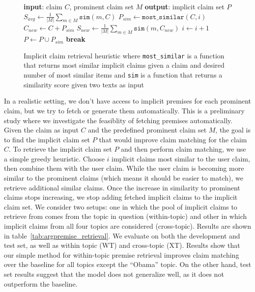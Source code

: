 \begin{figure}
\begin{algorithmic}[1]
\State \textbf{input}: claim $C$, prominent claim set $M$
\State \textbf{output}: implicit claim set $P$
\State
\State $S_{avg} \gets \frac{1}{|M|} \sum_{m \in M} \mathtt{sim}(m, C)$
  \State $P_{sim} \gets \mathtt{most\_similar}(C, i)$
  \State $C_{new} \gets C + P_{sim}$
  \State $S_{new} \gets \frac{1}{|M|} \sum_{m \in M} \mathtt{sim}(m, C_{new})$
  \State
    \State $i \gets i + 1$
    \State $P \gets P \cup P_{sim}$
  \Else
    \State \textbf{break}
  \EndIf
  \State
\EndFor
\end{algorithmic}
\caption{Implicit claim retrieval heuristic where \texttt{most\_similar} is a
	function that returns most similar implicit claims given a claim and
	desired number of most similar items and \texttt{sim} is a function that
	returns a similarity score given two texts as input}
\label{alg:premise_retrieval}
\end{figure}

In a realistic setting, we don't have access to implicit premises 
for each prominent claim, but we try to fetch or generate them automatically. 
This is a preliminary study where we investigate the feasiblity of fetching 
premises automatically. 
Given the claim as input $C$ and the predefined prominent claim set $M$, the
goal is to find the implicit claim set $P$ that would improve claim matching for the
claim $C$. 
To retrieve the implicit claim set $P$ and then perform claim matching, we use
a simple greedy heuristic. 
Choose $i$ implicit claims most similar to the user claim, then combine them
with the user claim.
While the user claim is becoming more similar to the prominent claims (which
means it should be easier to match), we retrieve additional similar claims. 
Once the increase in similarity to prominent claims stops increasing, we stop
adding fetched implicit claims to the implicit claim set. 
We consider two setups: one in which the pool of implicit claims to retrieve from comes from the 
topic in question (within-topic) and other in which implicit claims from all four topics are
considered (cross-topic). 
Results are shown in table~\ref{tab:argpremise_retrieval}. 
We evaluate on both the development and test set, as well as within topic (WT)
and cross-topic (XT). 
Results show that our simple method for within-topic premise retrieval improves
claim matching over the baseline for all topics except the ``Obama'' topic. 
On the other hand, test set results suggest that the model does not generalize well, 
as it does not outperform the baseline. 

